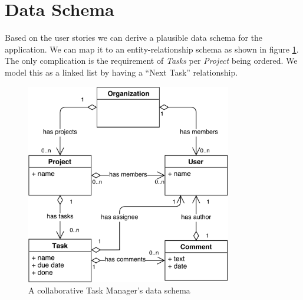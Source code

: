 \section{Data Schema}
Based on the user stories we can derive a plausible data schema for the application. We can map it to an entity-relationship schema as shown in figure \ref{fig:tasks-data-schema}.\\
The only complication is the requirement of \emph{Tasks} per \emph{Project} being ordered. We model this as a linked list by having a ``Next Task'' relationship.

\begin{figure}[tasks-data-schema]
\centering
\includegraphics[width=0.8\textwidth]{img/tasks-schema}
\caption{A collaborative Task Manager's data schema}
\label{fig:tasks-data-schema}
\end{figure}

